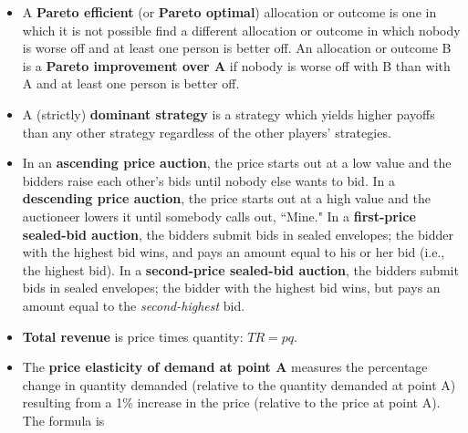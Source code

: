 \documentclass{article}
\begin{document}
\begin{EXAM}
\begin{itemize}
\item A \textbf{Pareto efficient} (or \textbf{Pareto optimal})
allocation or outcome is one in which it is not possible find a
different allocation or outcome in which nobody is worse off and
at least one person is better off. An allocation or outcome B is a
\textbf{Pareto improvement over A} if nobody is worse off with B
than with A and at least one person is better off.

\item A (strictly) \textbf{dominant strategy} is a strategy which yields higher payoffs than any other strategy regardless of the other players' strategies. %


\item In an \textbf{ascending price auction}, the price starts out at a low value and the bidders raise each other's bids until nobody else wants to bid. In a \textbf{descending price auction}, the price starts out at a high value and the auctioneer lowers it until somebody calls out, ``Mine." In a \textbf{first-price sealed-bid auction}, the bidders submit bids in sealed envelopes; the bidder with the highest bid wins, and pays an amount equal to his or her bid (i.e., the highest bid). In a \textbf{second-price sealed-bid auction}, the bidders submit bids in sealed envelopes; the bidder with the highest bid wins, but pays an amount equal to the \emph{second-highest} bid.



\item \textbf{Total revenue} is price times quantity: $TR = pq$.

\item The \textbf{price elasticity of demand at point A} measures
the percentage change in quantity demanded (relative to the
quantity demanded at point A) resulting from a 1\% increase in the
price (relative to the price at point A). The formula is


\end{itemize}
\end{EXAM}
\end{document}
